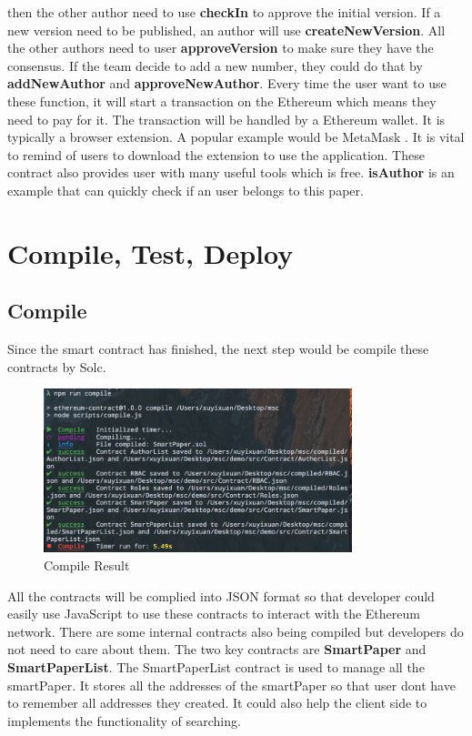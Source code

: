 \documentclass[openany,12pt]{ecsthesis}      %
\begin{document}
then the other author need to use \textbf{checkIn} to approve the initial version.
If a new version need to be published, an author will use \textbf{createNewVersion}. 
All the other authors need to user \textbf{approveVersion} to make sure they have the consensus.
If the team decide to add a new number, they could do that by \textbf{addNewAuthor} and \textbf{approveNewAuthor}.
Every time the user want to use these function, 
it will start a transaction on the Ethereum which means they need to pay for it.
The transaction will be handled by a Ethereum wallet. It is typically a browser extension. 
A popular example would be MetaMask \cite{metamask}. 
It is vital to remind of users to download the extension to use the application.
These contract also provides user with many useful tools which is free. 
\textbf{isAuthor} is an example that can quickly check if an user belongs to this paper.
\section{Compile, Test, Deploy}
\subsection{Compile}
Since the smart contract has finished, the next step would be compile these contracts by Solc.
\begin{figure}[H]
  \centering
  \includegraphics[width=0.8\textwidth]{compile.png}
  \caption{Compile Result}
  \label{compile} 
\end{figure}
All the contracts will be complied into JSON format so that developer could easily use JavaScript to use these contracts to interact with the Ethereum network.
There are some internal contracts also being compiled but developers do not need to care about them. The two key contracts are \textbf{SmartPaper} and \textbf{SmartPaperList}.
The SmartPaperList contract is used to manage all the smartPaper. 
It stores all the addresses of the smartPaper so that user dont have to remember all addresses they created.
It could also help the client side to implements the functionality of searching.
\end{document}
